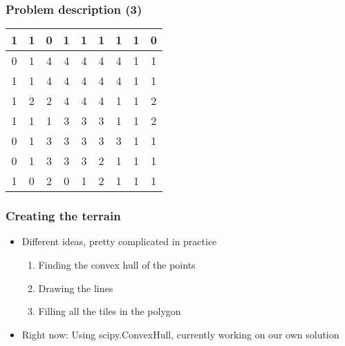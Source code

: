\documentclass{beamer}
\begin{document}
\begin{frame}
    \frametitle{Problem description (3)}

    \begin{tabular}{|c|c|c|c|c|c|c|c|c|}
            \hline
        \cellcolor{black!10}1&\cellcolor{black!10}1&0&\cellcolor{black!10}1&\cellcolor{black!10}1&\cellcolor{black!10}1&\cellcolor{black!10}1&\cellcolor{black!10}1&0\\
            \hline
        0&\cellcolor{black!10}1&\cellcolor{blue!25}4&\cellcolor{blue!25}4&\cellcolor{blue!25}4&\cellcolor{blue!25}4&\cellcolor{blue!25}4&\cellcolor{black!10}1&\cellcolor{black!10}1\\
            \hline  
        \cellcolor{black!10}1&\cellcolor{black!10}1&\cellcolor{blue!25}4&\cellcolor{blue!25}4&\cellcolor{blue!25}4&\cellcolor{blue!25}4&\cellcolor{blue!25}4&\cellcolor{black!10}1&\cellcolor{black!10}1\\
            \hline    
        \cellcolor{black!10}1&\cellcolor{red!25}2&\cellcolor{red!25}2&\cellcolor{blue!25}4&\cellcolor{blue!25}4&\cellcolor{blue!25}4&\cellcolor{black!10}1&\cellcolor{black!10}1&\cellcolor{red!25}2\\
            \hline
        \cellcolor{black!10}1&\cellcolor{black!10}1&\cellcolor{black!10}1&\cellcolor{green!25}3&\cellcolor{green!25}3&\cellcolor{green!25}3&\cellcolor{black!10}1&\cellcolor{black!10}1&\cellcolor{red!25}2\\
            \hline
        0&\cellcolor{black!10}1&\cellcolor{green!25}3&\cellcolor{green!25}3&\cellcolor{green!25}3&\cellcolor{green!25}3&\cellcolor{green!25}3&\cellcolor{black!10}1&\cellcolor{black!10}1\\
            \hline
        0&\cellcolor{black!10}1&\cellcolor{green!25}3&\cellcolor{green!25}3&\cellcolor{green!25}3&\cellcolor{red!25}2&\cellcolor{black!10}1&\cellcolor{black!10}1&\cellcolor{black!10}1\\
            \hline
        \cellcolor{black!10}1&0&\cellcolor{red!25}2&0&\cellcolor{black!10}1&\cellcolor{red!25}2&\cellcolor{black!10}1&\cellcolor{black!10}1&\cellcolor{black!10}1\\              
            \hline
    \end{tabular} 
\end{frame}

\begin{frame}
    \frametitle{Creating the terrain}
    \begin{itemize}
        \item Different ideas, pretty complicated in practice
            \begin{enumerate}
                \item Finding the convex hull of the points
                \item Drawing the lines
                \item Filling all the tiles in the polygon
            \end{enumerate}
        \item Right now: Using scipy.ConvexHull, currently working on our own solution
    \end{itemize}
\end{frame}
\end{document}
